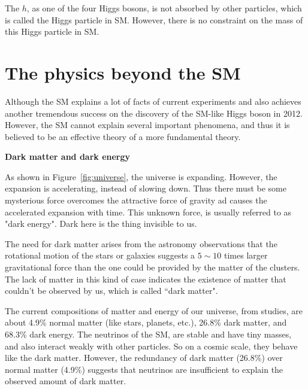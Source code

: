 The $h$, as one of the four Higgs bosons, is not absorbed by other particles, which is called
the Higgs particle in SM.  However, there is no constraint on the mass of this Higgs particle in SM.



\section{The physics beyond the SM}

Although the SM explains a lot of facts of current experiments and also achieves another tremendous success on 
the discovery of the SM-like Higgs boson in 2012. However, the SM cannot explain several
important phenomena, and thus it is believed to be an effective theory of a more fundamental
theory. 

{\bf Dark matter and dark energy}

As shown in Figure~\ref{fig:universe}, the universe is expanding. However, the expansion is accelerating, instead of slowing down. 
Thus there must be some mysterious force overcomes the attractive force of gravity ad  
causes the accelerated expansion with time. 
This unknown force, is usually referred to as "dark energy". Dark here is 
the thing invisible to us. 

The need for dark matter arises from the astronomy observations that the rotational motion of 
the stars or galaxies suggests a $5{\sim}10$ times larger gravitational force than the one could be provided 
by the matter of the clusters. The lack of matter in this kind of case indicates the existence of 
matter that couldn't be observed by us, which is called ``dark matter".   
 
The current compositions of matter and energy of our universe, from studies, are about 4.9\% normal matter (like stars, planets, etc.), 26.8\% dark matter, and 68.3\% dark energy. The neutrinos of the SM, are stable and have tiny masses, and also interact weakly with other particles. So on a cosmic scale, they behave like 
the dark matter. However, the redundancy of dark matter (26.8\%) over normal matter (4.9\%) suggests that neutrinos are insufficient to explain the observed amount of dark matter. 

